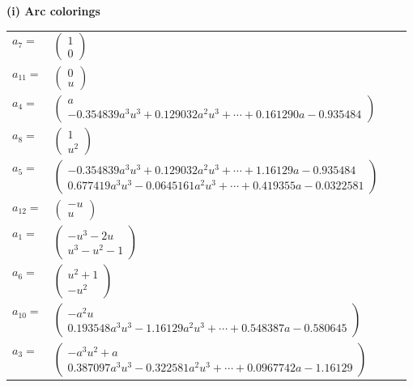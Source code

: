 \documentclass[1p]{elsarticle_modified}
\theoremstyle{definition}
\begin{document}
\flushleft \textbf{(i) Arc colorings}\\
\begin{tabular}{m{7pt} m{180pt} m{7pt} m{180pt} }
\flushright $a_{7}=$&$\begin{pmatrix}1\\0\end{pmatrix}$ \\
\flushright $a_{11}=$&$\begin{pmatrix}0\\u\end{pmatrix}$ \\
\flushright $a_{4}=$&$\begin{pmatrix}a\\-0.354839 a^{3} u^{3}+0.129032 a^{2} u^{3}+\cdots+0.161290 a-0.935484\end{pmatrix}$ \\
\flushright $a_{8}=$&$\begin{pmatrix}1\\u^2\end{pmatrix}$ \\
\flushright $a_{5}=$&$\begin{pmatrix}-0.354839 a^{3} u^{3}+0.129032 a^{2} u^{3}+\cdots+1.16129 a-0.935484\\0.677419 a^{3} u^{3}-0.0645161 a^{2} u^{3}+\cdots+0.419355 a-0.0322581\end{pmatrix}$ \\
\flushright $a_{12}=$&$\begin{pmatrix}- u\\u\end{pmatrix}$ \\
\flushright $a_{1}=$&$\begin{pmatrix}- u^3-2 u\\u^3- u^2-1\end{pmatrix}$ \\
\flushright $a_{6}=$&$\begin{pmatrix}u^2+1\\- u^2\end{pmatrix}$ \\
\flushright $a_{10}=$&$\begin{pmatrix}- a^2 u\\0.193548 a^{3} u^{3}-1.16129 a^{2} u^{3}+\cdots+0.548387 a-0.580645\end{pmatrix}$ \\
\flushright $a_{3}=$&$\begin{pmatrix}- a^3 u^2+a\\0.387097 a^{3} u^{3}-0.322581 a^{2} u^{3}+\cdots+0.0967742 a-1.16129\end{pmatrix}$ \\

\end{tabular}
\end{document}
